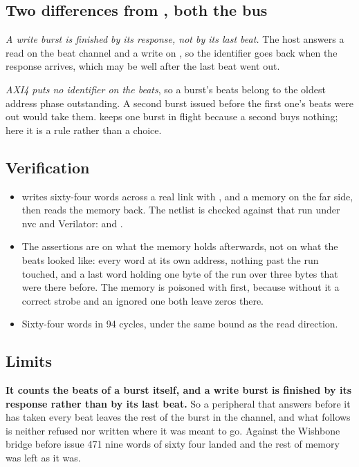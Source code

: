 \subsection*{Two differences from , both the bus}

\emph{A write burst is finished by its response, not by its last
beat.} The host answers a read on the beat channel and a write on
, so the identifier goes back when the response arrives,
which may be well after the last beat went out.

\emph{AXI4 puts no identifier on the beats}, so a burst's beats
belong to the oldest address phase outstanding. A second burst issued
before the first one's beats were out would take them. 
keeps one burst in flight because a second buys nothing; here it is a
rule rather than a choice.

\subsection*{Verification}

\begin{itemize}
\item {} writes sixty-four words across a real link with
,  and a memory on the far side, then
reads the memory back. The netlist is checked against that run under
nvc and Verilator:  and
.
\item The assertions are on what the memory holds afterwards, not on
what the beats looked like: every word at its own address, nothing
past the run touched, and a last word holding one byte of the run
over three bytes that were there before. The memory is poisoned with
 first, because without it a correct strobe and an
ignored one both leave zeros there.
\item Sixty-four words in 94 cycles, under the same bound as the read
direction.
\end{itemize}

\subsection*{Limits}

\textbf{It counts the beats of a burst itself, and a write burst is
finished by its response rather than by its last beat.} So a
peripheral that answers before it has taken every beat leaves the
rest of the burst in the channel, and what follows is neither refused
nor written where it was meant to go. Against the Wishbone bridge
before issue 471 nine words of sixty four landed and the rest of
memory was left as it was.

